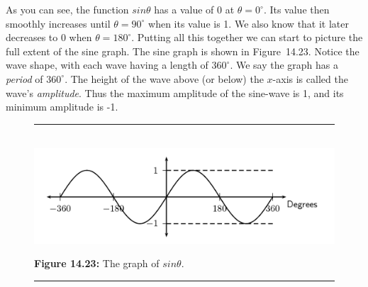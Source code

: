         
        \label{m39414*id84327}As you can see, the function \begin{math}sin\theta \end{math} has a value of 0 at \begin{math}\theta ={0}^{\circ }\end{math}. Its value then smoothly increases until \begin{math}\theta ={90}^{\circ }\end{math} when its value is 1. We also know that it later decreases to 0 when \begin{math}\theta ={180}^{\circ }\end{math}. Putting all this together we can start to picture the full extent of the sine graph. The sine graph is shown in Figure~14.23. Notice the wave shape, with each wave having a length of \begin{math}{360}^{\circ }\end{math}. We say the graph has a \textsl{period} of \begin{math}{360}^{\circ }\end{math}. The height of the wave above (or below) the \begin{math}x\end{math}-axis is called the wave's \textsl{amplitude}. Thus the maximum amplitude of the sine-wave is 1, and its minimum amplitude is -1.\par 
        
    \setcounter{subfigure}{0}


	\begin{figure}[H] %
    \begin{center}
    \rule[.1in]{\figurerulewidth}{.005in} \\
        \label{m39414*uid31!!!underscore!!!media}\label{m39414*uid31!!!underscore!!!printimage}\includegraphics{col11306.imgs/m39414_MG10C15_017.png} %
        
      \vspace{2pt}
    \vspace{\rubberspace}\par \begin{cnxcaption}
	  \small \textbf{Figure 14.23: }The graph of \begin{math}sin\theta \end{math}.
	\end{cnxcaption}
      
    \vspace{.1in}
    \rule[.1in]{\figurerulewidth}{.005in} \\
        
    \end{center}

 \end{figure}   

